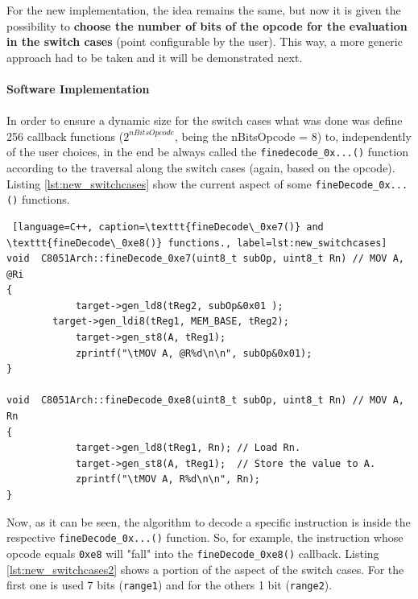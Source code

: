 For the new implementation, the idea remains the same, but now it is given the possibility to \textbf{choose the number of bits of the opcode for the evaluation in the switch cases} (point configurable by the user). This way, a more generic approach had to be taken and it will be demonstrated next.

\paragraph{Software Implementation}

\paragraph{}

  In order to ensure a dynamic size for the switch cases what was done was define 256 callback functions ($2^{nBitsOpcode}$, being the nBitsOpcode = 8) to, independently of the user choices, in the end be always called the \texttt{finedecode\_0x...()} function according to the traversal along the switch cases (again, based on the opcode). Listing \ref{lst:new_switchcases} show the current aspect of some \texttt{fineDecode\_0x...()} functions.

\begin{lstlisting} [language=C++, caption=\texttt{fineDecode\_0xe7()} and \texttt{fineDecode\_0xe8()} functions., label=lst:new_switchcases]
void  C8051Arch::fineDecode_0xe7(uint8_t subOp, uint8_t Rn)	// MOV A, @Ri
{   
			target->gen_ld8(tReg2, subOp&0x01 );
  		target->gen_ldi8(tReg1, MEM_BASE, tReg2);
			target->gen_st8(A, tReg1);
			zprintf("\tMOV A, @R%d\n\n", subOp&0x01);  
} 

void  C8051Arch::fineDecode_0xe8(uint8_t subOp, uint8_t Rn)	// MOV A, Rn
{   
			target->gen_ld8(tReg1, Rn); // Load Rn.
			target->gen_st8(A, tReg1);  // Store the value to A.
			zprintf("\tMOV A, R%d\n\n", Rn); 
}
\end{lstlisting}

Now, as it can be seen, the algorithm to decode a specific instruction is inside the respective \texttt{fineDecode\_0x...()} function. So, for example, the instruction whose opcode equals \texttt{0xe8} will "fall" into the \texttt{fineDecode\_0xe8()} callback. Listing \ref{lst:new_switchcases2} shows a portion of the aspect of the switch cases. For the first one is used 7 bits (\texttt{range1}) and for the others 1 bit (\texttt{range2}).

